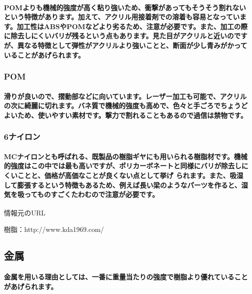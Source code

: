 \documentclass[b5paper, 9pt, twocolumn, titlepage,openany]{jsbook}%
\begin{document}
\paragraph{POMよりも機械的強度が高く粘り強いため、衝撃があってもそうそう割れないという特徴があります。加えて、アクリル用接着剤での溶着も容易となっています。加工性はABSやPOMなどより劣るため、注意が必要です。また、加工の際に除去しにくいバリが残るという点もあります。見た目がアクリルと近いのですが、異なる特徴として弾性がアクリルより強いことと、断面が少し青みがかっていることがあげられます。}

\subsubsection{POM}

\paragraph{滑りが良いので、摺動部などに向いています。レーザー加工も可能で、アクリルの次に綺麗に切れます。バネ質で機械的強度も高めで、色々と手ごろでちょうどよいため、使いやすい素材です。撃力で割れることもあるので過信は禁物です。}

\subsubsection{6ナイロン}

\paragraph{MCナイロンとも呼ばれる、既製品の樹脂ギヤにも用いられる樹脂材です。機械的強度はこの中では最も高いですが、ポリカーボネートと同様にバリが除去しにくいことと、価格が高価なことが良くない点として挙げ られます。また、吸湿して膨張するという特徴もあるため、例えば長い梁のようなパーツを作ると、湿気を吸ってものすごくたわむので注意が必要です。}

情報元のURL

樹脂：http://www.kda1969.com/

\subsection{金属}

\paragraph{金属を用いる理由としては、一番に重量当たりの強度で樹脂より優れていることがあげられます。}
\end{document}
